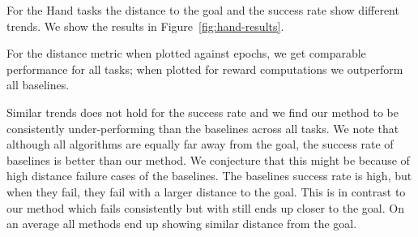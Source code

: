For the Hand tasks the distance to the goal and the success rate show different trends.
We show the results in Figure~\ref{fig:hand-results}.

For the distance metric when plotted against epochs, we get comparable
performance for all tasks; when plotted for reward computations we outperform
all baselines.

Similar trends does not hold for the success rate and we find our method to be
consistently under-performing than the baselines across all tasks. We note that
although all algorithms are equally far away from the goal, the success rate of
baselines is better than our method. We conjecture that this might be because of
high distance failure cases of the baselines. The baselines success rate is
high, but when they fail, they fail with a larger distance to the goal. This is
in contrast to our method which fails consistently but with still ends up closer
to the goal. On an average all methods end up showing similar distance from the goal.


